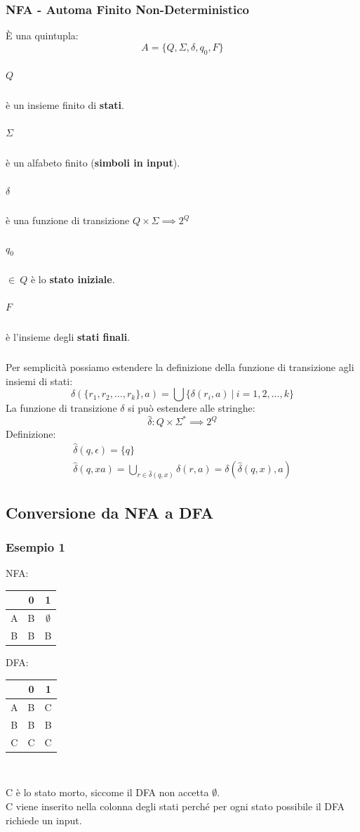 \documentclass[12pt]{article}
\begin{document}
\subsubsection{NFA - Automa Finito Non-Deterministico}
È una quintupla:
\begin{equation*}
    A=\{Q,\Sigma,\delta,q_0,F\}
\end{equation*}
\subparagraph*{$Q$} è un insieme finito di \textbf{stati}.
\subparagraph*{$\Sigma$} è un alfabeto finito (\textbf{simboli in input}).
\subparagraph*{$\delta$} è una funzione di transizione $Q\times\Sigma\implies 2^Q$
\subparagraph*{$q_0$} $\in\ Q$ è lo \textbf{stato iniziale}.
\subparagraph*{$F$} è l'insieme degli \textbf{stati finali}.
\subparagraph*{}
Per semplicità possiamo estendere la definizione della funzione di transizione
agli insiemi di stati:
\begin{equation*}
    \delta(\{r_1,r_2,\dots,r_k\},a)=\bigcup\{\delta(r_i,a)\ |\ i=1,2,\dots,k\}
\end{equation*}
La funzione di transizione $\delta$ si può estendere alle stringhe:
\begin{equation*}
    \hat{\delta}:Q\times\Sigma^*\implies 2^Q
\end{equation*}
Definizione:
\begin{gather*}
    \hat{\delta}(q,\epsilon)=\{q\}\\
    \hat{\delta}(q,xa)=\bigcup_{r\in\hat{\delta}(q,x)}\delta(r,a)=\delta(\hat{\delta}(q,x),a) 
\end{gather*}

\subsection{Conversione da NFA a DFA}
\subsubsection{Esempio 1}
NFA:
\begin{center}
    \begin{tabular}{c |c c} 
     & 0 & 1 \\
    \hline
    A & B & $\emptyset$\\
    B & B & B  \\
   \end{tabular}
\end{center}
DFA:
\begin{center}
    \begin{tabular}{c |c c} 
     & 0 & 1 \\
    \hline
    A & B & C\\
    B & B & B  \\
    C & C & C
   \end{tabular}\\

\end{center}
C è lo stato morto, siccome il DFA non accetta $\emptyset$.
\\C viene inserito nella colonna degli stati perché per ogni stato possibile
il DFA richiede un input.
\end{document}
